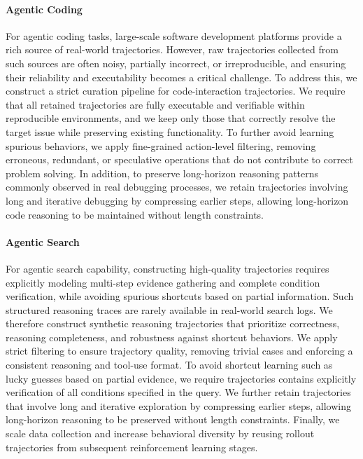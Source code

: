 \documentclass{article}
\begin{document}
\paragraph{Agentic Coding}
For agentic coding tasks, large-scale software development platforms provide a rich source of real-world trajectories.
However, raw trajectories collected from such sources are often noisy, partially incorrect, or irreproducible, and ensuring their reliability and executability becomes a critical challenge.
To address this, we construct a strict curation pipeline for code-interaction trajectories. 
We require that all retained trajectories are fully executable and verifiable within reproducible environments, and we keep only those that correctly resolve the target issue while preserving existing functionality. 
To further avoid learning spurious behaviors, we apply fine-grained action-level filtering, removing erroneous, redundant, or speculative operations that do not contribute to correct problem solving. 
In addition, to preserve long-horizon reasoning patterns commonly observed in real debugging processes, we retain trajectories involving long and iterative debugging by compressing earlier steps, allowing long-horizon code reasoning to be maintained without length constraints.

\paragraph{Agentic Search}
For agentic search capability, constructing high-quality trajectories requires explicitly modeling multi-step evidence gathering and complete condition verification, while avoiding spurious shortcuts based on partial information. Such structured reasoning traces are rarely available in real-world search logs. 
We therefore construct synthetic reasoning trajectories that prioritize correctness, reasoning completeness, and robustness against shortcut behaviors.
We apply strict filtering to ensure trajectory quality, removing trivial cases and enforcing a consistent reasoning and tool-use format.
To avoid shortcut learning such as lucky guesses based on partial evidence, we require trajectories contains explicitly verification of all conditions specified in the query.
We further retain trajectories that involve long and iterative exploration by compressing earlier steps, allowing long-horizon reasoning to be preserved without length constraints.
Finally, we scale data collection and increase behavioral diversity by reusing rollout trajectories from subsequent reinforcement learning stages.
\end{document}
